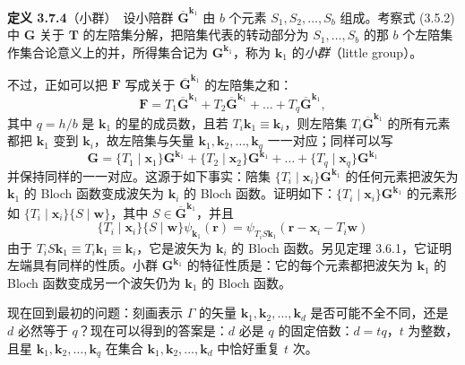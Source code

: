 \noindent\textbf{定义 3.7.4}\quad （小群）\ 设小陪群 $\overline{\mathbf{G}}^{\mathbf{k}_{1}}$ 由 $b$ 个元素 $S_{1}, S_{2}, \dots, S_{b}$ 组成。考察式 (3.5.2) 中 $\mathbf{G}$ 关于 $\mathbf{T}$ 的左陪集分解，把陪集代表的转动部分为 $S_{1}, \dots, S_{b}$ 的那 $b$ 个左陪集作集合论意义上的并，所得集合记为 $\mathbf{G}^{\mathbf{k}_{1}}$，称为 $\mathbf{k}_{1}$ 的\textit{小群}（little group）。

不过，正如可以把 $\mathbf{F}$ 写成关于 $\overline{\mathbf{G}}^{\mathbf{k}_{1}}$ 的左陪集之和：
\begin{equation*}
\mathbf{F} = T_{1}\overline{\mathbf{G}}^{\mathbf{k}_{1}} + T_{2}\overline{\mathbf{G}}^{\mathbf{k}_{1}} + \dots + T_{q}\overline{\mathbf{G}}^{\mathbf{k}_{1}},
\tag{3.7.2}
\end{equation*}
其中 $q = h/b$ 是 $\mathbf{k}_{1}$ 的星的成员数，且若 $T_{i}\mathbf{k}_{1} \equiv \mathbf{k}_{i}$，则左陪集 $T_{i}\overline{\mathbf{G}}^{\mathbf{k}_{1}}$ 的所有元素都把 $\mathbf{k}_{1}$ 变到 $\mathbf{k}_{i}$，故左陪集与矢量 $\mathbf{k}_{1}, \mathbf{k}_{2}, \dots, \mathbf{k}_{q}$ 一一对应；同样可以写
\begin{equation*}
\mathbf{G} = \{T_{1} \mid \mathbf{x}_{1}\}\mathbf{G}^{\mathbf{k}_{1}} + \{T_{2} \mid \mathbf{x}_{2}\}\mathbf{G}^{\mathbf{k}_{1}} + \dots + \{T_{q} \mid \mathbf{x}_{q}\}\mathbf{G}^{\mathbf{k}_{1}}
\tag{3.7.3}
\end{equation*}
并保持同样的一一对应。这源于如下事实：陪集 $\{T_{i} \mid \mathbf{x}_{i}\}\mathbf{G}^{\mathbf{k}_{1}}$ 的任何元素把波矢为 $\mathbf{k}_{1}$ 的 Bloch 函数变成波矢为 $\mathbf{k}_{i}$ 的 Bloch 函数。证明如下：$\{T_{i} \mid \mathbf{x}_{i}\}\mathbf{G}^{\mathbf{k}_{1}}$ 的元素形如 $\{T_{i} \mid \mathbf{x}_{i}\}\{S \mid \mathbf{w}\}$，其中 $S \in \overline{\mathbf{G}}^{\mathbf{k}_{1}}$，并且
\begin{equation*}
\{T_{i} \mid \mathbf{x}_{i}\}\{S \mid \mathbf{w}\}\psi_{\mathbf{k}_{1}}(\mathbf{r}) = \psi_{T_{i}S\mathbf{k}_{1}}(\mathbf{r} - \mathbf{x}_{i} - T_{i}\mathbf{w})
\end{equation*}
由于 $T_{i}S\mathbf{k}_{1} \equiv T_{i}\mathbf{k}_{1} \equiv \mathbf{k}_{i}$，它是波矢为 $\mathbf{k}_{i}$ 的 Bloch 函数。另见定理 3.6.1，它证明左端具有同样的性质。小群 $\mathbf{G}^{\mathbf{k}_{1}}$ 的特征性质是：它的每个元素都把波矢为 $\mathbf{k}_{1}$ 的 Bloch 函数变成另一个波矢仍为 $\mathbf{k}_{1}$ 的 Bloch 函数。

现在回到最初的问题：刻画表示 $\Gamma$ 的矢量 $\mathbf{k}_{1}, \mathbf{k}_{2}, \dots, \mathbf{k}_{d}$ 是否可能不全不同，还是 $d$ 必然等于 $q$？现在可以得到的答案是：$d$ 必是 $q$ 的固定倍数：$d = tq$，$t$ 为整数，且星 $\mathbf{k}_{1}, \mathbf{k}_{2}, \dots, \mathbf{k}_{q}$ 在集合 $\mathbf{k}_{1}, \mathbf{k}_{2}, \dots, \mathbf{k}_{d}$ 中恰好重复 $t$ 次。

